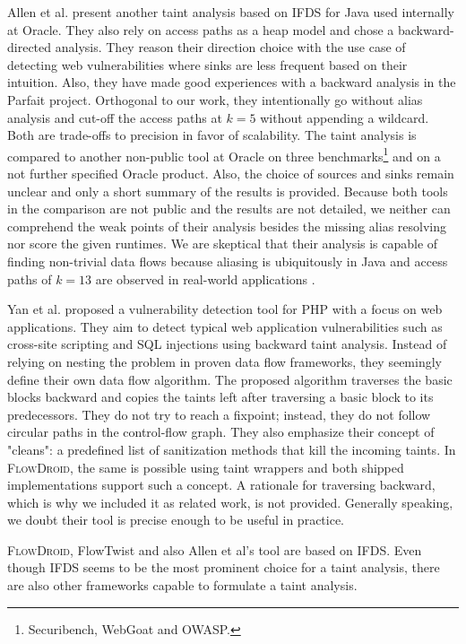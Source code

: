 \documentclass[../draft.tex]{subfiles}
\begin{document}
    Allen et al.\cite{Allen2021} present another taint analysis based on IFDS for Java used internally at Oracle. 
    They also rely on access paths as a heap model and chose a backward-directed analysis. 
    They reason their direction choice with the use case of detecting web vulnerabilities where sinks are less frequent based on their intuition. 
    Also, they have made good experiences with a backward analysis in the Parfait\cite{Winter2013} project.
    Orthogonal to our work, they intentionally go without alias analysis and cut-off the access paths at $k=5$ without appending a wildcard. 
    Both are trade-offs to precision in favor of scalability. 
    The taint analysis is compared to another non-public tool at Oracle on three benchmarks\footnote{Securibench, WebGoat and OWASP.} and on a not further specified Oracle product. 
    Also, the choice of sources and sinks remain unclear and only a short summary of the results is provided.
    Because both tools in the comparison are not public and the results are not detailed, we neither can comprehend the weak points of their analysis besides the missing alias resolving nor score the given runtimes.
    We are skeptical that their analysis is capable of finding non-trivial data flows because aliasing is ubiquitously in Java and access paths of $k=13$ are observed in real-world applications \cite{Spaeth2019}. 

    Yan et al.\cite{Yan2017} proposed a vulnerability detection tool for PHP with a focus on web applications. 
    They aim to detect typical web application vulnerabilities such as cross-site scripting and SQL injections using backward taint analysis. 
    Instead of relying on nesting the problem in proven data flow frameworks, they seemingly define their own data flow algorithm. 
    The proposed algorithm traverses the basic blocks backward and copies the taints left after traversing a basic block to its predecessors. 
    They do not try to reach a fixpoint; instead, they do not follow circular paths in the control-flow graph.
    They also emphasize their concept of "cleans": a predefined list of sanitization methods that kill the incoming taints. 
    In \textsc{FlowDroid}, the same is possible using taint wrappers and both shipped implementations support such a concept.
    A rationale for traversing backward, which is why we included it as related work, is not provided. 
    Generally speaking, we doubt their tool is precise enough to be useful in practice.

    \textsc{FlowDroid}, FlowTwist and also Allen et al's tool are based on IFDS.
    Even though IFDS seems to be the most prominent choice for a taint analysis, there are also other frameworks capable to formulate a taint analysis.
\end{document}
